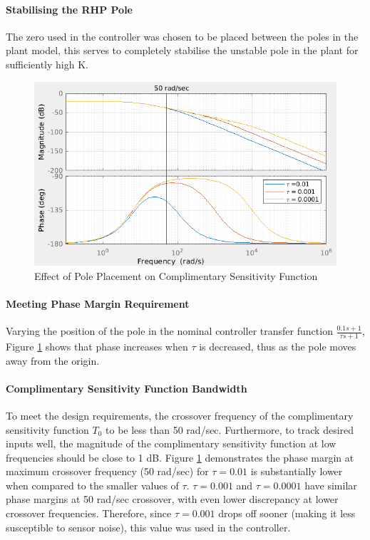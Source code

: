 \documentclass[11pt, a4paper,twocolumn]{article}
\begin{document}
		\paragraph{Stabilising the RHP Pole}
			The zero used in the controller was chosen to be placed between the poles in the plant model, this serves to completely stabilise the unstable pole in the plant for sufficiently high K. 
			
			\begin{figure}[ht!]
			\centering
			\includegraphics[scale=0.35]{vary_p}
			\caption{Effect of Pole Placement on Complimentary Sensitivity Function}
			\label{fig:vary_p}
			\end{figure}			
			
		\paragraph{Meeting Phase Margin Requirement}
			Varying the position of the pole in the nominal controller transfer function $ \frac{0.1s + 1}{\tau s + 1} $, Figure \ref{fig:vary_p} shows that phase increases when $ \tau $ is decreased, thus as the pole moves away from the origin. 
			
		\paragraph{Complimentary Sensitivity Function Bandwidth}			
			To meet the design requirements, the crossover frequency of the complimentary sensitivity function $T_0$ to be less than 50 rad/sec. Furthermore, to track desired inputs well, the magnitude of  the complimentary sensitivity function at low frequencies should be close to 1 dB. Figure \ref{fig:vary_p} demonstrates the phase margin at maximum crossover frequency (50 rad/sec) for $ \tau = 0.01 $ is substantially lower when compared to the smaller values of $ \tau $. $ \tau = 0.001 $ and $ \tau = 0.0001 $ have similar phase margins at 50 rad/sec crossover, with even lower discrepancy at lower crossover frequencies. Therefore, since $ \tau = 0.001 $ drops off sooner (making it less susceptible to sensor noise), this value was used in the controller.
\end{document}
